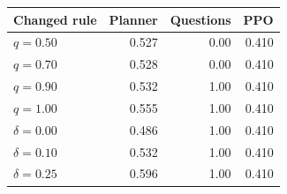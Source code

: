 \begin{tabular}{lrrr}
\toprule
Changed rule & Planner & Questions & PPO \\
\midrule
$q=0.50$ & 0.527 & 0.00 & 0.410 \\
$q=0.70$ & 0.528 & 0.00 & 0.410 \\
$q=0.90$ & 0.532 & 1.00 & 0.410 \\
$q=1.00$ & 0.555 & 1.00 & 0.410 \\
$\delta=0.00$ & 0.486 & 1.00 & 0.410 \\
$\delta=0.10$ & 0.532 & 1.00 & 0.410 \\
$\delta=0.25$ & 0.596 & 1.00 & 0.410 \\
\bottomrule
\end{tabular}
